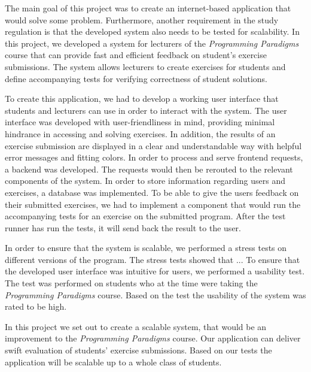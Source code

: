 The main goal of this project was to create an internet-based application that would solve some problem.
Furthermore, another requirement in the study regulation is that the developed system also needs to be tested for scalability. 
In this project, we developed a system for lecturers of the \textit{Programming Paradigms} course that can provide fast and efficient feedback on student's exercise submissions.
The system allows lecturers to create exercises for students and define accompanying tests for verifying correctness of student solutions.

To create this application, we had to develop a working user interface that students and lecturers can use in order to interact with the system. 
The user interface was developed with user-friendliness in mind, providing minimal hindrance in accessing and solving exercises. 
In addition, the results of an exercise submission are displayed in a clear and understandable way with helpful error messages and fitting colors.
In order to process and serve frontend requests, a backend was developed.
The requests would then be rerouted to the relevant components of the system. 
In order to store information regarding users and exercises, a database was implemented.
To be able to give the users feedback on their submitted exercises, we had to implement a component that would run the accompanying tests for an exercise on the submitted program. 
After the test runner has run the tests, it will send back the result to the user.

In order to ensure that the system is scalable, we performed a stress tests on different versions of the program.
The stress tests showed that ... 
To ensure that the developed user interface was intuitive for users, we performed a usability test.
The test was performed on students who at the time were taking the \textit{Programming Paradigms} course.
Based on the test the usability of the system was rated to be high.  

In this project we set out to create a scalable system, that would be an improvement to the \textit{Programming Paradigms} course.
Our application can deliver swift evaluation of students' exercise submissions. Based on our tests the application will be scalable up to a whole class of students.
